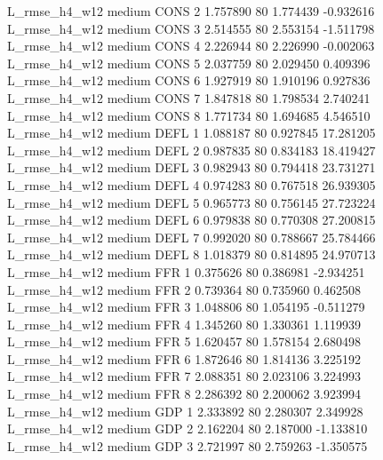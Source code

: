  L_rmse_h4_w12     medium     CONS                 2  1.757890 80       1.774439          -0.932616
 L_rmse_h4_w12     medium     CONS                 3  2.514555 80       2.553154          -1.511798
 L_rmse_h4_w12     medium     CONS                 4  2.226944 80       2.226990          -0.002063
 L_rmse_h4_w12     medium     CONS                 5  2.037759 80       2.029450           0.409396
 L_rmse_h4_w12     medium     CONS                 6  1.927919 80       1.910196           0.927836
 L_rmse_h4_w12     medium     CONS                 7  1.847818 80       1.798534           2.740241
 L_rmse_h4_w12     medium     CONS                 8  1.771734 80       1.694685           4.546510
 L_rmse_h4_w12     medium     DEFL                 1  1.088187 80       0.927845          17.281205
 L_rmse_h4_w12     medium     DEFL                 2  0.987835 80       0.834183          18.419427
 L_rmse_h4_w12     medium     DEFL                 3  0.982943 80       0.794418          23.731271
 L_rmse_h4_w12     medium     DEFL                 4  0.974283 80       0.767518          26.939305
 L_rmse_h4_w12     medium     DEFL                 5  0.965773 80       0.756145          27.723224
 L_rmse_h4_w12     medium     DEFL                 6  0.979838 80       0.770308          27.200815
 L_rmse_h4_w12     medium     DEFL                 7  0.992020 80       0.788667          25.784466
 L_rmse_h4_w12     medium     DEFL                 8  1.018379 80       0.814895          24.970713
 L_rmse_h4_w12     medium      FFR                 1  0.375626 80       0.386981          -2.934251
 L_rmse_h4_w12     medium      FFR                 2  0.739364 80       0.735960           0.462508
 L_rmse_h4_w12     medium      FFR                 3  1.048806 80       1.054195          -0.511279
 L_rmse_h4_w12     medium      FFR                 4  1.345260 80       1.330361           1.119939
 L_rmse_h4_w12     medium      FFR                 5  1.620457 80       1.578154           2.680498
 L_rmse_h4_w12     medium      FFR                 6  1.872646 80       1.814136           3.225192
 L_rmse_h4_w12     medium      FFR                 7  2.088351 80       2.023106           3.224993
 L_rmse_h4_w12     medium      FFR                 8  2.286392 80       2.200062           3.923994
 L_rmse_h4_w12     medium      GDP                 1  2.333892 80       2.280307           2.349928
 L_rmse_h4_w12     medium      GDP                 2  2.162204 80       2.187000          -1.133810
 L_rmse_h4_w12     medium      GDP                 3  2.721997 80       2.759263          -1.350575
